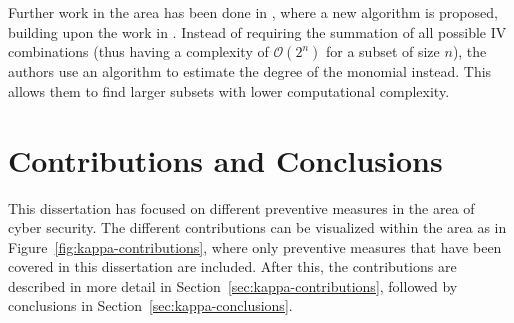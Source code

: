 Further work in the area has been done in \cite{yang:2019}, where a new algorithm is proposed, building upon the work in .
Instead of requiring the summation of all possible IV combinations (thus having a complexity of $\mathcal{O}(2^n)$ for a subset of size $n$), the authors use an algorithm to estimate the degree of the monomial instead.
This allows them to find larger subsets with lower computational complexity.

\chapter{Contributions and Conclusions}

This dissertation has focused on different preventive measures in the area of cyber security.
The different contributions can be visualized within the area as in Figure~\ref{fig:kappa-contributions}, where only preventive measures that have been covered in this dissertation are included.
After this, the contributions are described in more detail in Section~\ref{sec:kappa-contributions}, followed by conclusions in Section~\ref{sec:kappa-conclusions}.

